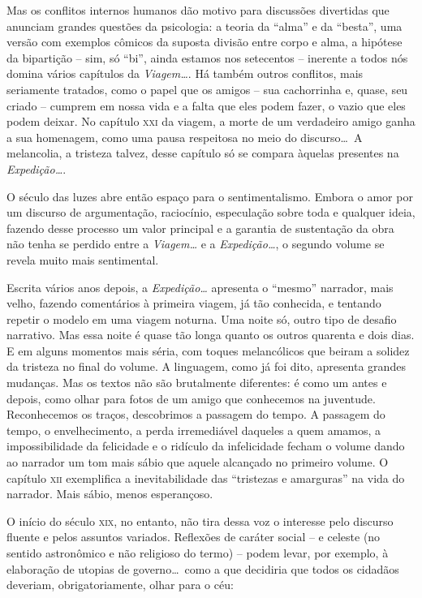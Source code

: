 Mas os conflitos internos humanos dão motivo para discussões divertidas
que anunciam grandes questões da psicologia: a teoria da ``alma'' e da
``besta'', uma versão com exemplos cômicos da suposta divisão entre corpo
e alma, a hipótese da bipartição -- sim,  só ``bi'', ainda estamos nos
setecentos -- inerente a todos nós domina vários capítulos da
\textit{Viagem\ldots}. Há também outros conflitos, mais seriamente
tratados, como o papel que os amigos -- sua cachorrinha e, quase, seu
criado -- cumprem em nossa vida  e a falta que eles podem fazer, o vazio
que eles podem deixar. No capítulo \textsc{xxi} da viagem, a morte de um
verdadeiro amigo ganha a sua homenagem, como uma pausa respeitosa no
meio do discurso\ldots\ A melancolia, a tristeza talvez, desse capítulo só
se compara àquelas presentes na \textit{Expedição\ldots}. 

O século das luzes abre então espaço para o sentimentalismo. Embora o
amor por um discurso de argumentação, raciocínio, especulação sobre
toda e qualquer ideia, fazendo desse processo um valor principal e a
garantia de sustentação da obra não tenha se perdido entre a
\textit{Viagem\ldots} e a \textit{Expedição\ldots},  o segundo volume se
revela muito mais sentimental.

Escrita vários anos depois, a \textit{Expedição\ldots} apresenta o ``mesmo''
narrador, mais velho, fazendo comentários à primeira viagem, já tão
conhecida, e tentando repetir o modelo em uma viagem noturna. Uma noite
só, outro tipo de desafio narrativo. Mas essa noite é quase tão longa
quanto os outros quarenta e dois dias. E em alguns momentos mais séria,
com toques melancólicos que beiram a solidez da tristeza no final do
volume. A linguagem, como já foi dito, apresenta grandes mudanças. Mas
os textos não são brutalmente diferentes: é como um antes e depois,
como olhar para fotos de um amigo que conhecemos na juventude.
Reconhecemos os traços, descobrimos a passagem do tempo. A passagem do
tempo, o envelhecimento, a perda irremediável daqueles a quem amamos, a
impossibilidade da felicidade e o ridículo da infelicidade fecham o
volume dando ao narrador um tom mais sábio que aquele alcançado no
primeiro volume. O capítulo \textsc{xii} exemplifica a inevitabilidade das
``tristezas e amarguras'' na vida do narrador. Mais sábio, menos
esperançoso. 

O início do século \textsc{xix}, no entanto, não tira dessa voz o interesse pelo
discurso fluente e pelos assuntos variados. Reflexões de caráter social
-- e celeste (no sentido astronômico e não religioso do termo) -- podem
levar, por exemplo, à elaboração de utopias de governo\ldots\ como a que
decidiria que todos os cidadãos deveriam, obrigatoriamente, olhar para o céu: 

